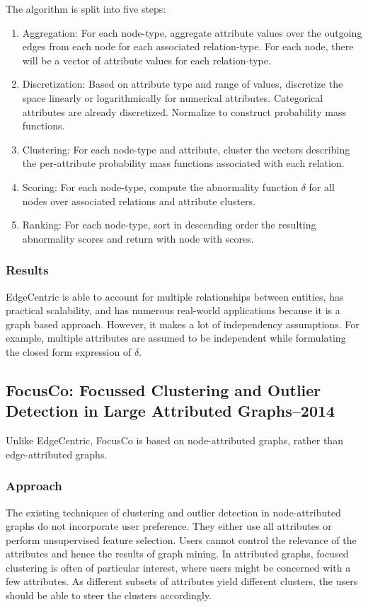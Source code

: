 \documentclass[11pt, oneside]{article}   	%
\begin{document}
\quad The algorithm is split into five steps:
\begin{enumerate}
\item Aggregation: For each node-type, aggregate attribute values over the outgoing edges from each node for each associated relation-type.
For each node, there will be a vector of attribute values for each relation-type.
\item Discretization: Based on attribute type and range of values, discretize the space linearly or logarithmically for numerical attributes.
Categorical attributes are already discretized.
Normalize to construct probability mass functions.
\item Clustering: For each node-type and attribute, cluster the vectors describing the per-attribute probability mass functions associated with each relation.
\item Scoring: For each node-type, compute the abnormality function $\delta$ for all nodes over associated relations and attribute clusters.
\item Ranking: For each node-type, sort in descending order the resulting abnormality scores and return with node with scores.
\end{enumerate}

\subsubsection*{Results}

\quad EdgeCentric is able to account for multiple relationships between entities, has practical scalability, and has numerous real-world applications because it is a graph based approach.
However, it makes a lot of independency assumptions.
For example, multiple attributes are assumed to be independent while formulating the closed form expression of $\delta$. 


\subsection*{FocusCo: Focussed Clustering and Outlier Detection in Large Attributed Graphs--2014}

\quad Unlike EdgeCentric, FocusCo is based on node-attributed graphs, rather than edge-attributed graphs.

\subsubsection*{Approach}

\quad The existing techniques of clustering and outlier detection in node-attributed graphs do not incorporate user preference.
They either use all attributes or perform unsupervised feature selection.
Users cannot control the relevance of the attributes and hence the results of graph mining. %
In attributed graphs, focused clustering is often of particular interest, where users might be concerned with a few attributes. 
As different subsets of attributes yield different clusters, the users should be able to steer the clusters accordingly.
\end{document}
